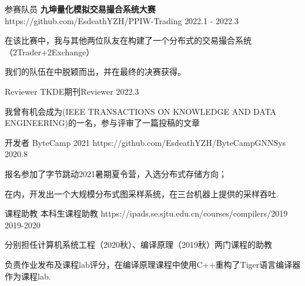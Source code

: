 \begin{cventries}
\vspace{-4mm}

\cventry
{参赛队员} %
{\textbf{九坤量化模拟交易撮合系统大赛}} %
{https://github.com/EsdeathYZH/PPIW-Trading} %
{2022.1 - 2022.3} %
{ %
    \begin{cvlargeitems}
        \item {在该比赛中，我与其他两位队友在构建了一个分布式的交易撮合系统（2Trader+2Exchange）}
        \item {我们的队伍在中脱颖而出，并在最终的决赛获得。}
    \end{cvlargeitems}
}

\vspace{-4mm}

\cventry
{Reviewer} %
{TKDE期刊Reviewer} %
{} %
{2022.3} %
{ %
	\begin{cvitems}
		\item {我曾有机会成为(IEEE TRANSACTIONS ON KNOWLEDGE AND DATA ENGINEERING)的一名，参与评审了一篇投稿的文章}
	\end{cvitems}
}

\vspace{-3mm}

\cventry
{开发者} %
{ByteCamp 2021} %
{https://github.com/EsdeathYZH/ByteCampGNNSys} %
{2020.8} %
{ %
    \begin{cvlargeitems}
        \item {报名参加了字节跳动2021暑期夏令营，入选分布式存储方向；}
        \item {在内，开发出一个大规模分布式图采样系统，在三台机器上提供的采样吞吐.}
    \end{cvlargeitems}
}

\vspace{-4mm}

\cventry
{课程助教} %
{本科生课程助教} %
{https://ipads.se.sjtu.edu.cn/courses/compilers/2019} %
{2019-2020} %
{ %
    \begin{cvlargeitems}
        \item {分别担任计算机系统工程（2020秋）、编译原理（2019秋）两门课程的助教}
        \item {负责作业发布及课程lab评分，在编译原理课程中使用C++重构了Tiger语言编译器作为课程lab.}
    \end{cvlargeitems}
}


\end{cventries}
